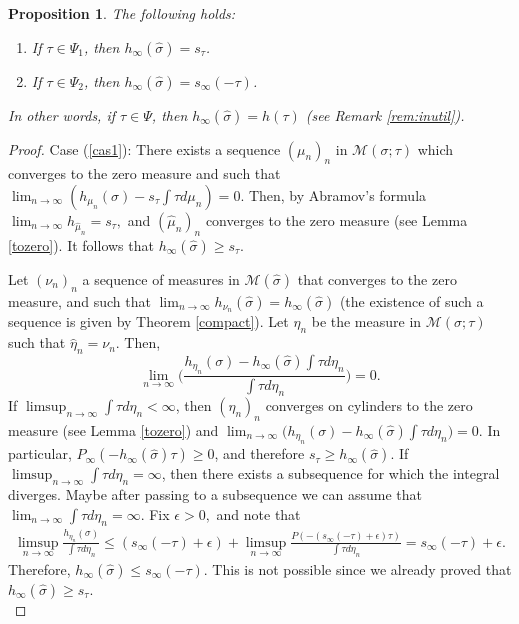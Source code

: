 \documentclass[letterpaper,11pt]{amsart}
\theoremstyle{plain}
\theoremstyle{plain}
\newtheorem{proposition}{Proposition}[subsection]
\theoremstyle{definition}
\theoremstyle{remark}
\def\e{\epsilon}
\def\M{{\mathcal M}}
\begin{document}
\begin{proposition}\label{prop:Gs} The following holds:
\begin{enumerate} 
\item\label{cas1} If $\tau\in \Psi_1$, then $h_\infty(\widehat{\sigma})=s_{\tau}$. 
\item\label{cas2} If $\tau \in \Psi_2$, then $h_\infty(\widehat{\sigma})= s_\infty(-\tau)$. 
\end{enumerate}
In other words, if $\tau\in\Psi$, then $h_\infty(\widehat{\sigma})=h(\tau)$ (see Remark \ref{rem:inutil}).
\end{proposition}
\begin{proof}


Case (\ref{cas1}): There exists a sequence $(\mu_n)_n$ in $\M(\sigma;\tau)$ which converges to the zero measure and such that $\lim_{n\to\infty}(h_{\mu_n}(\sigma)- s_\tau\int \tau d\mu_n)=0$. Then, by Abramov's formula $\lim_{n\to\infty}h_{\widehat{\mu}_n}=s_\tau,$  and $(\widehat{\mu}_n)_n$ converges to the zero measure (see Lemma \ref{tozero}). It follows that $h_\infty(\widehat{\sigma})\ge{s}_{\tau}$. 

Let $(\nu_n)_n$ a sequence of measures in $\M(\widehat{\sigma})$ that converges to the zero measure, and such that $\lim_{n\to\infty}h_{\nu_n}(\widehat{\sigma})=h_\infty(\widehat{\sigma})$ (the existence of such a sequence is given by Theorem \ref{compact}).
 Let $\eta_n$ be the measure in   $\M(\sigma;\tau)$ such that $\widehat{\eta}_n =\nu_n$. Then, 
$$\lim_{n\to\infty}\bigg(\frac{h_{\eta_n}(\sigma)-h_\infty(\widehat{\sigma})\int \tau d\eta_n}{\int \tau d\eta_n}\bigg)=0.$$
If $\limsup_{n\to\infty}\int \tau d\eta_n<\infty$, then $(\eta_n)_n$ converges on cylinders to the zero measure (see Lemma \ref{tozero}) and  $\lim_{n\to\infty}\big(h_{\eta_n}(\sigma)-h_\infty(\widehat{\sigma})\int \tau d\eta_n\big)=0.$
In particular, ${P}_\infty(-h_\infty(\widehat{\sigma})\tau)\ge 0$, and therefore ${s}_{\tau}\ge h_\infty(\widehat{\sigma})$. If $\limsup_{n\to\infty}\int \tau d\eta_n=\infty$, then there exists a subsequence for which the integral diverges. Maybe after passing to a subsequence we can assume that $\lim_{n\to\infty}\int \tau d\eta_n=\infty$. Fix $\e>0,$ and note that 
\begin{align}\label{s}  \limsup_{n\to\infty} \frac{h_{\eta_n}(\sigma)}{\int \tau d\eta_n}\le (s_\infty(-\tau)+\e)+\limsup_{n\to\infty}\frac{P(-(s_\infty(-\tau)+\e)\tau)}{\int \tau d\eta_n}=s_\infty(-\tau)+\e.\end{align}
Therefore, $h_\infty(\widehat{\sigma})\le s_\infty(-\tau)$. This is not possible since we already proved that  $h_\infty(\widehat{\sigma})\ge{s}_{\tau}$.\\


\end{proof}
\end{document}
